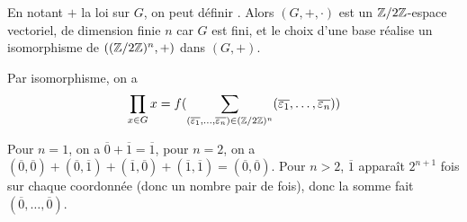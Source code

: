 \begin{remark}
	En notant $+$ la loi sur $G$, on peut définir . Alors $(G,+,\cdot)$ est un $\mathbb{Z}/2\mathbb{Z}$-espace vectoriel, de dimension finie $n$ car $G$ est fini, et le choix d'une base réalise un isomorphisme de $((\mathbb{Z}/2\mathbb{Z})^{n},+)$ dans $(G,+)$.
\end{remark}

\begin{remark}
	Par isomorphisme, on a 
	$$\prod_{x\in G}x=f(\sum_{(\overline{\varepsilon_{1}},\dots,\overline{\varepsilon_{n}})\in(\mathbb{Z}/2\mathbb{Z})^{n}}(\overline{\varepsilon_{1}},\dots,\overline{\varepsilon_{n}}))$$

	Pour $n=1$, on a $\overline{0}+\overline{1}=\overline{1}$, pour $n=2$, on a $(\overline{0},\overline{0})+(\overline{0},\overline{1})+(\overline{1},\overline{0})+(\overline{1},\overline{1})=(\overline{0},\overline{0})$. Pour $n>2$, $\overline{1}$ apparaît $2^{n+1}$ fois sur chaque coordonnée (donc un nombre pair de fois), donc la somme fait $(\overline{0},\dots,\overline{0})$.
\end{remark}


